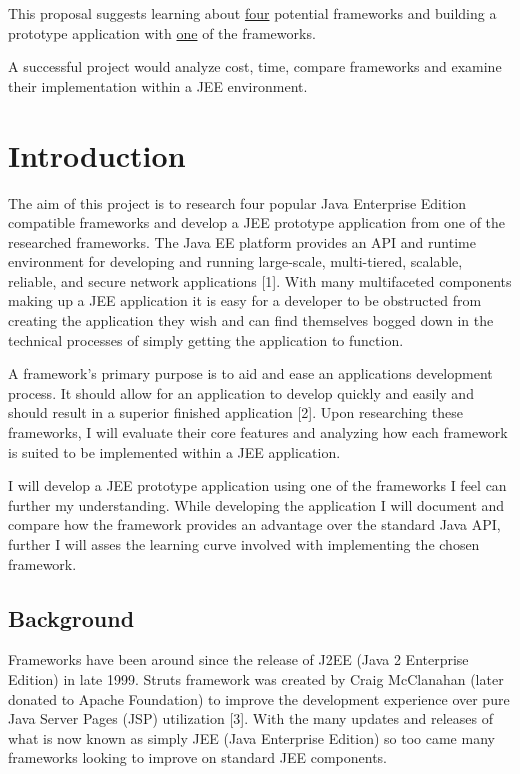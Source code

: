 \documentclass[]{report}
\begin{document}
	This proposal suggests learning about \underline{four} potential frameworks and building a prototype application with \underline{one} of the frameworks.
	
	A successful project would analyze cost, time, compare frameworks and examine their implementation within a JEE environment.

\newpage

\section{Introduction}

The aim of this project is to research four popular Java Enterprise Edition compatible frameworks and develop a JEE prototype application from one of the researched frameworks. The Java EE platform provides an API and runtime environment for developing and running large-scale, multi-tiered, scalable, reliable, and secure network applications [1]. With many multifaceted components making up a JEE application it is easy for a developer to be obstructed from creating the application they wish and can find themselves bogged down in the technical processes of simply getting the application to function. 

A framework’s primary purpose is to aid and ease an applications development process. It should allow for an application to develop quickly and easily and should result in a superior finished application [2]. Upon researching these frameworks, I will evaluate their core features and analyzing how each framework is suited to be implemented within a JEE application.


I will develop a JEE prototype application using one of the frameworks I feel can further my understanding. While developing the application I will document and compare how the framework provides an advantage over the standard Java API, further I will asses the learning curve involved with implementing the chosen framework.

	\subsection{Background}
	Frameworks have been around since the release of J2EE (Java 2 Enterprise Edition) in late 1999. Struts framework was created by Craig McClanahan (later donated to Apache Foundation) to improve the development experience over pure Java Server Pages (JSP) utilization [3]. With the many updates and releases of what is now known as simply JEE (Java Enterprise Edition) so too came many frameworks looking to improve on standard JEE components. 
	
\end{document}
